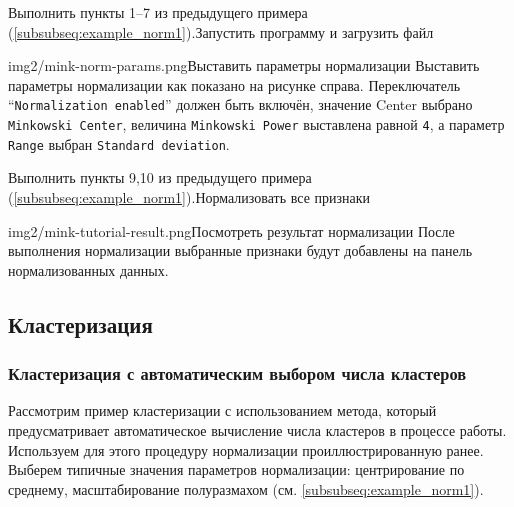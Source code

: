 \documentclass[12pt,tikz]{instruction}
\begin{document}
\begin{steps}
	\begin{istt}{Выполнить пункты 1--7 из предыдущего примера (\ref{subsubseq:example_norm1}).}{Запустить программу и загрузить файл}
	\end{istt}
	\begin{ist}{img2/mink-norm-params.png}{Выставить параметры нормализации}
		Выставить параметры нормализации как показано на рисунке справа. Переключатель ``\texttt{Normalization enabled}'' должен быть включён, значение Center выбрано \texttt{Minkowski Center}, величина \texttt{Minkowski Power} выставлена равной \texttt{4}, а параметр \texttt{Range} выбран \texttt{Standard deviation}.
	\end{ist}
	\begin{istt}{Выполнить пункты 9,10 из предыдущего примера (\ref{subsubseq:example_norm1}).}{Нормализовать все признаки}
	\end{istt}
	\begin{ist}{img2/mink-tutorial-result.png}{Посмотреть результат нормализации}
		После выполнения нормализации выбранные признаки будут добавлены на панель нормализованных данных.
	\end{ist}
\end{steps}

\subsection{Кластеризация}
\subsubsection{Кластеризация с автоматическим выбором числа кластеров}
\label{subsubsec:clustering_example1}
Рассмотрим пример кластеризации с использованием метода, который предусматривает автоматическое вычисление числа кластеров в процессе работы. Используем для этого процедуру нормализации проиллюстрированную ранее. Выберем типичные значения параметров нормализации: центрирование по среднему, масштабирование полуразмахом (см. \ref{subsubseq:example_norm1}). 
\end{document}
